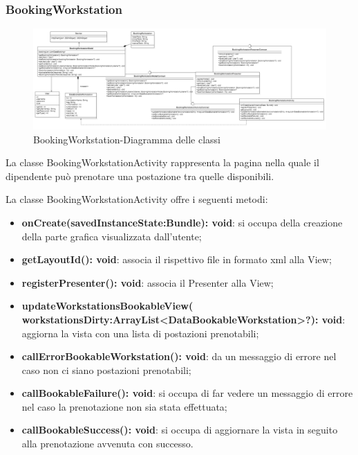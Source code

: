 \subsubsection{BookingWorkstation}
\begin{figure}[H]
	\centering
	\includegraphics[width=16cm]{res/images/BookingWorkstation.png}
	\caption{BookingWorkstation-Diagramma delle classi}
	\label{fig:BookingWorkstation-Diagramma delle classi}
\end{figure}
La classe BookingWorkstationActivity rappresenta la pagina nella quale il dipendente può prenotare una postazione tra quelle disponibili.

La classe BookingWorkstationActivity offre i seguenti metodi:
\begin{itemize}
	\item \textbf{onCreate(savedInstanceState:Bundle): void}: si occupa della creazione della parte grafica visualizzata dall'utente; 
	\item \textbf{getLayoutId(): void}: associa il rispettivo file in formato xml alla View;
	\item \textbf{registerPresenter(): void}: associa il Presenter alla View; 
	\item \textbf{updateWorkstationsBookableView( workstationsDirty:ArrayList<DataBookableWorkstation>?): void}: aggiorna la vista con una lista di postazioni prenotabili; 
	\item \textbf{callErrorBookableWorkstation(): void}: da un messaggio di errore nel caso non ci siano postazioni prenotabili;
	\item \textbf{callBookableFailure(): void}: si occupa di far vedere un messaggio di errore nel caso la prenotazione non sia stata effettuata; 
	\item \textbf{callBookableSuccess(): void}: si occupa di aggiornare la vista in seguito alla prenotazione avvenuta con successo.
\end{itemize}

